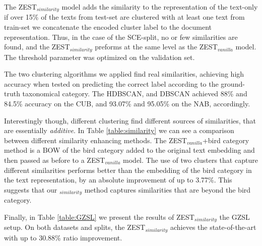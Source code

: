 \documentclass[11pt,a4paper]{article}
\newcommand\yuval[1]{\textcolor{darkpink}{\textbf{YUVAL:} #1 }}
\newcommand\reut[1]{\textcolor{green}{\textbf{REUT:} #1 }}
\begin{document}
The ZEST$_{similarity}$ model adds the similarity to the representation of the text-only if over 15\% of the texts from test-set are clustered with at least one text from train-set we concatenate the encoded cluster label to the document representation.
Thus, in the case of the SCE-split, no or few similarities are found, and the ZEST$_{similarity}$ preforms at the same level as the ZEST$_{vanilla}$ model. %
The threshold parameter was optimized on the validation set. 




The two clustering algorithms we applied find real similarities, achieving high accuracy when tested on predicting the correct label according to the ground-truth taxonomical category. The HDBSCAN, and DBSCAN achieved 88\% and 84.5\% accuracy on the CUB, and 93.07\% and 95.05\% on the NAB, accordingly.

Interestingly though, different clustering find different sources of similarities, that are essentially {\em additive}. In Table \ref{table:similarity} we can see a comparison between different similarity enhancing methods. 
The ZEST$_{vanilla}$+bird category method is a BOW of the bird category added to the original text embedding and then passed as before to a ZEST$_{vanilla}$ model. 
The use of two clusters that capture different similarities performs better than the embedding of the bird category in the text representation, by an absolute improvement of up to 3.77\%. This suggests that our $_{similarity}$ method captures similarities that are beyond the bird category. %

Finally, 
in Table \ref{table:GZSL} we present the results of ZEST$_{similarity}$ the GZSL setup. On both datasets and splits, the ZEST$_{similarity}$ achieves the state-of-the-art with up to 30.88\% ratio improvement.
\end{document}
